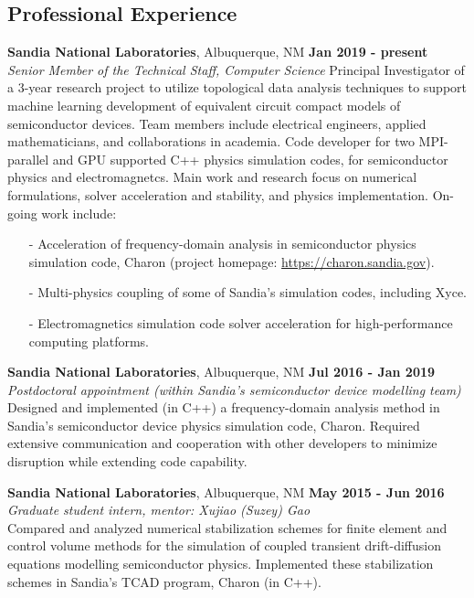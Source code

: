 \documentclass[margin,line]{res}
\begin{document}
\begin{resume}
\section{\sc Professional Experience}
{\bf Sandia National Laboratories}, Albuquerque, NM \hfill {\bf Jan 2019 - present}\\
{\em Senior Member of the Technical Staff, Computer Science}
\vskip -5pt
Principal Investigator of a 3-year research project to utilize topological data analysis techniques to support machine learning development of equivalent circuit compact models of semiconductor devices. Team members include electrical engineers, applied mathematicians, and collaborations in academia.
\vskip -5pt
Code developer for two MPI-parallel and GPU supported C++ physics simulation codes, for semiconductor physics and electromagnetcs. Main work and research focus on numerical formulations, solver acceleration and stability, and physics implementation. On-going work include:
\begin{itemize}
\setlength\itemsep{0pt}
\item[-] Acceleration of frequency-domain analysis in semiconductor physics simulation code, \newline Charon (project homepage: \url{https://charon.sandia.gov}).
\item[-] Multi-physics coupling of some of Sandia's simulation codes, including Xyce.
\item[-] Electromagnetics simulation code solver acceleration for high-performance computing platforms.
\end{itemize}

{\bf Sandia National Laboratories}, Albuquerque, NM \hfill {\bf Jul 2016 - Jan 2019}\\
{\em Postdoctoral appointment (within Sandia's semiconductor device modelling team)}\\
Designed and implemented (in C++) a frequency-domain analysis method in Sandia's semiconductor device physics simulation code, Charon. Required extensive communication and cooperation with other developers to minimize disruption while extending code capability.

{\bf Sandia National Laboratories}, Albuquerque, NM \hfill {\bf May 2015 - Jun 2016}\\
{\em Graduate student intern, mentor: Xujiao (Suzey) Gao}\\
Compared and analyzed numerical stabilization schemes for finite element and control volume methods for the simulation of coupled transient drift-diffusion equations modelling semiconductor physics. Implemented these stabilization schemes in Sandia's TCAD program, Charon (in C++).


\end{resume}
\end{document}

